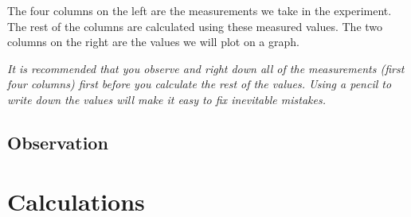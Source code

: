 \documentclass{article}
\begin{document}
         The four columns on the left are the measurements we take in the experiment. The rest of the columns are calculated using these measured values. The two columns on the right are the values we will plot on a graph.

         \textit{It is recommended that you observe and right down all of the measurements (first four columns) first before you calculate the rest of the values. Using a pencil to write down the values will make it easy to fix inevitable mistakes.}

      \subsection*{Observation}

         





   \section*{Calculations}
\end{document}
